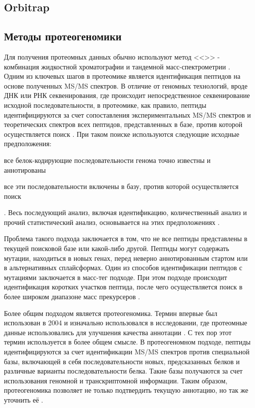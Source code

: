 \subsection{Orbitrap}

\subsection{Методы протеогеномики}
Для получения протеомных данных обычно используют метод <<>> - комбинация жидкостной хроматографии и тандемной масс-спектрометрии \cite{bantscheff2012quantitative}. Одним из ключевых шагов в протеомике является идентификация пептидов на основе полученных MS/MS спектров. В отличие от геномных технологий, вроде ДНК или РНК секвенирования, где происходит непосредственное секвенирование исходной последовательности, в протеомике, как правило, пептиды идентифицируются за счет сопоставления экспериментальных MS/MS спектров и теоретических спектров всех пептидов, представленных в базе, против которой осуществляется поиск \cite{nesvizhskii2010survey}.
При таком поиске используются следующие исходные предположения: 
\begin{inparaenum}
    \item все белок-кодирующие последовательности генома точно известны и аннотированы
    \item все эти последовательности включены в базу, против которой осуществляется поиск
\end{inparaenum}.
Весь последующий анализ, включая идентификацию, количественный анализ и прочий статистический анализ, основывается на этих предположениях \cite{nesvizhskii2005interpretation}.

Проблема такого подхода заключается в том, что не все пептиды представлены в текущей поисковой базе или какой-либо другой. Пептиды могут содержать мутации, находиться в новых генах, перед неверно аннотированным стартом или в альтернативных сплайсформах. 
Один из способов идентификации пептидов с мутациями заключается в масс-тег подходе. При этом подходе происходит идентификация коротких участков пептида, после чего осуществляется поиск в более широком диапазоне масс прекурсеров \cite{dasari2010tagrecon}. 

Более общим подходом является протеогеномика. Термин впервые был использован в 2004 и изначально использовался в исследовании, где протеомные данные использовались для улучшения качества аннотации \cite{jaffe2004proteogenomic}. С тех пор этот термин используется в более общем смысле. В протеогеномном подходе, пептиды идентифицируются за счет идентификации MS/MS спектров против специальной базы, включающей в себя последовательности новых, предсказанных белков и различные варианты последовательности белка. Такие базы получаются за счет использования геномной и транскриптомной информации. Таким образом, протеогеномика позволяет не только подтвердить текущую аннотацию, но так же уточнить её \cite{nesvizhskii2014proteogenomics}. 

